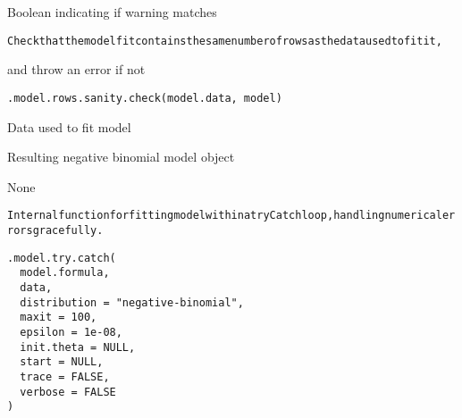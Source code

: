 \documentclass[letterpaper]{book}
\begin{document}
%
\begin{Value}
Boolean indicating if warning matches
\end{Value}
%
\begin{Description}
\begin{alltt}Check that the model fit contains the same number of rows as the data used to fit it, 
\end{alltt}


and throw an error if not
\end{Description}
%
\begin{Usage}
\begin{verbatim}
.model.rows.sanity.check(model.data, model)
\end{verbatim}
\end{Usage}
%
\begin{Arguments}
\begin{ldescription}
\item[\code{model.data}] Data used to fit model

\item[\code{model}] Resulting negative binomial model object
\end{ldescription}
\end{Arguments}
%
\begin{Value}
None
\end{Value}
%
\begin{Description}
\begin{alltt}Internal function for fitting model within a tryCatch loop, handling numerical errors gracefully.
\end{alltt}

\end{Description}
%
\begin{Usage}
\begin{verbatim}
.model.try.catch(
  model.formula,
  data,
  distribution = "negative-binomial",
  maxit = 100,
  epsilon = 1e-08,
  init.theta = NULL,
  start = NULL,
  trace = FALSE,
  verbose = FALSE
)
\end{verbatim}
\end{Usage}
%
\end{document}
